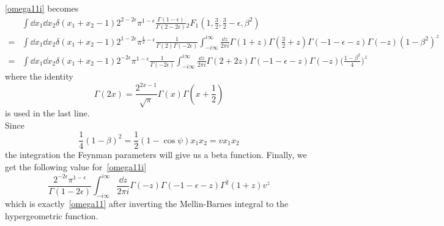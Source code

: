 \cref{omega11i} becomes
\begin{equation*}
\begin{split}
& \int\dd x_1\dd x_2 
\delta(x_1+x_2-1) 
2^{2-2\epsilon} 
\pi^{1-\epsilon}\frac{\Gamma(1-\epsilon)}{\Gamma(2-2\epsilon)}
{}_2F_1(1,\frac{3}{2},\frac{3}{2}-\epsilon, \beta^2)
\\
= &
\int\dd x_1\dd x_2 \delta(x_1+x_2-1)
2^{1-2\epsilon}\pi^{\frac{1}{2}-\epsilon}\frac{1}{\Gamma(2)\Gamma(-2\epsilon)}\int^{i\infty}_{-i\infty}\frac{\dd z}{2\pi i}\Gamma(1+z)\Gamma(\frac{3}{2}+z)\Gamma(-1-\epsilon-z)\Gamma(-z)(1-\beta^2)^z
\\
=&
\int\dd x_1\dd x_2 \delta(x_1+x_2-1)
2^{-2\epsilon}\pi^{1-\epsilon}\frac{1}{\Gamma(-2\epsilon)}\int^{i\infty}_{-i\infty}\frac{\dd z}{2\pi i}\Gamma(2+2z)\Gamma(-1-\epsilon-z)\Gamma(-z)\big(\frac{1-\beta^2}{4}\big)^z
\end{split}
\end{equation*}
where the identity
\begin{equation*}
\Gamma(2x) = \frac{2^{2x-1}}{\sqrt{\pi}}\Gamma(x)\Gamma(x+\frac{1}{2})
\end{equation*}
is used in the last line.
\\Since
\begin{equation*}
\frac{1}{4}(1-\beta)^2 = \frac{1}{2}(1-\cos\psi)x_1x_2 = vx_1x_2 
\end{equation*}
the integration \wrt the Feynman parameters will give us a beta function.
Finally, we get the following value for~\cref{omega11i}
\begin{equation*}
\frac{2^{-2\epsilon}\pi^{1-\epsilon}}{\Gamma(1-2\epsilon)}\int^{i\infty}_{-i\infty}\frac{\dd z}{2\pi i}\Gamma(-z)\Gamma(-1-\epsilon -z)\Gamma^2(1+z) v^z
\end{equation*}
which is exactly~\cref{omega11} after inverting the Mellin-Barnes integral to the hypergeometric function.
